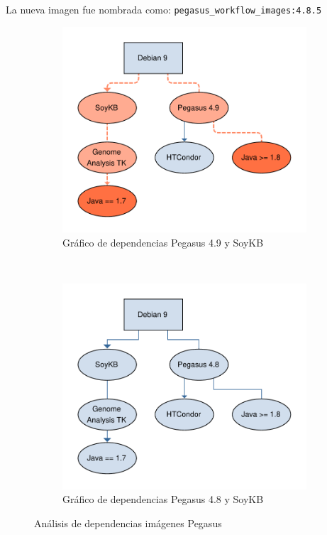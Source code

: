 La nueva imagen fue nombrada como: \verb|pegasus_workflow_images:4.8.5|


\begin{figure}[t]
    \centering
    \begin{subfigure}[b]{0.40\textwidth}
         \centering
         \includegraphics[width=\textwidth]{Figures/pegasus-49.pdf}
         \caption{Gráfico de dependencias Pegasus 4.9 y SoyKB}
         \label{fig:pegasus49}
     \end{subfigure}
    ~ 
    \begin{subfigure}[b]{0.40\textwidth}
         \centering
         \includegraphics[width=\textwidth]{Figures/pegasus-48.pdf}
         \caption{Gráfico de dependencias Pegasus 4.8 y SoyKB}
         \label{fig:pegasus48}
     \end{subfigure}
        \caption{Análisis de dependencias imágenes Pegasus}
        \label{fig:dependencies-graph}
\end{figure}

